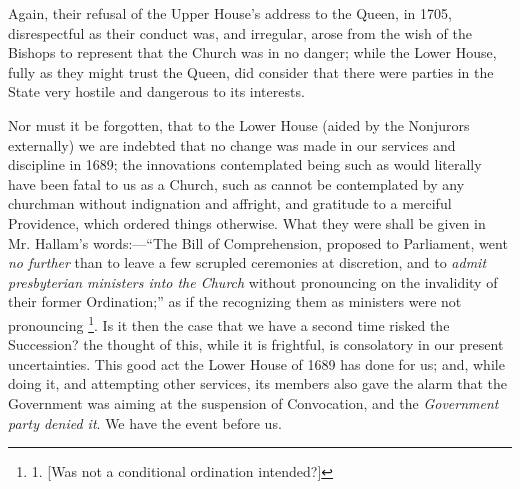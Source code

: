 Again, their refusal of the
Upper House's address to the Queen, in 1705, disrespectful as their
conduct was, and irregular, arose from the wish of the Bishops to
represent that the Church was in no danger; while the Lower House,
fully as they might trust the Queen, did consider that there were
parties in the State very hostile and dangerous to its interests.

Nor must it be forgotten, that
to the Lower House (aided by the Nonjurors externally) we are indebted
that no change was made in our services and discipline in 1689; the
innovations contemplated being such as would literally have been fatal
to us as a Church, such as cannot be contemplated by any churchman
without indignation and affright, and gratitude to a merciful
Providence, which ordered things otherwise. What they were shall be
given in Mr. Hallam's words:—``The Bill of Comprehension, proposed to
Parliament, went \emph{no further} than to leave a few scrupled
ceremonies at discretion, and to \emph{admit presbyterian ministers into
the Church} without pronouncing on the invalidity of their former
Ordination;'' as if the recognizing them as ministers were not
pronouncing \footnote{

1. [Was not a conditional
ordination intended?]}. Is it then
the case that we have a second time risked the Succession? the thought
of this, while it is frightful, is consolatory in our present
uncertainties. This good act the Lower House of 1689 has done for us;
and, while doing it, and attempting other services, its members also
gave the alarm that the Government was aiming at the suspension of
Convocation, and the \emph{Government party denied it}. We have the
event before us.

